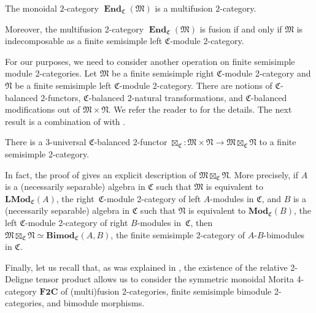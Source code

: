 \begin{Theorem}\label{thm:Moritadual}
The monoidal $2$-category $\mathbf{\operatorname{End}}_{\mathfrak{C}}(\mathfrak{M})$ is a multifusion $2$-category.
\end{Theorem}

Moreover, the multifusion 2-category $\mathbf{\operatorname{End}}_{\mathfrak{C}}(\mathfrak{M})$ is fusion if and only if $\mathfrak{M}$ is indecomposable as a finite semisimple left $\mathfrak{C}$-module 2-category.

For our purposes, we need to consider another operation on finite semisimple module 2-categories. Let $\mathfrak{M}$ be a finite semisimple right $\mathfrak{C}$-module 2-category and $\mathfrak{N}$ be a finite semisimple left $\mathfrak{C}$-module 2-category. There are notions of $\mathfrak{C}$-balanced 2-functors, $\mathfrak{C}$-balanced 2-natural transformations, and $\mathfrak{C}$-balanced modifications out of $\mathfrak{M}\times\mathfrak{N}$. We refer the reader to \cite[Section~2.2]{D10} for the details. The next result is a combination of \cite[Theorem~2.2.4]{D10} with \cite[Corollary~5.1.3]{D9}.

\begin{Theorem}
There is a $3$-universal $\mathfrak{C}$-balanced $2$-functor $\boxtimes_{\mathfrak{C}}\colon \mathfrak{M}\times\mathfrak{N}\rightarrow \mathfrak{M}\boxtimes_{\mathfrak{C}}\mathfrak{N}$ to a finite semisimple $2$-category.
\end{Theorem}

In fact, the proof of \cite[Theorem~2.2.4]{D10} gives an explicit description of $\mathfrak{M}\boxtimes_{\mathfrak{C}}\mathfrak{N}$. More precisely, if $A$ is a (necessarily separable) algebra in $\mathfrak{C}$ such that $\mathfrak{M}$ is equivalent to $\mathbf{LMod}_{\mathfrak{C}}(A)$, the right~$\mathfrak{C}$-module 2-category of left $A$-modules in $\mathfrak{C}$, and $B$ is a (necessarily separable) algebra in $\mathfrak{C}$ such that $\mathfrak{N}$ is equivalent to $\mathbf{Mod}_{\mathfrak{C}}(B)$, the left $\mathfrak{C}$-module 2-category of right $B$-modules in~$\mathfrak{C}$, then~$\mathfrak{M}\boxtimes_{\mathfrak{C}}\mathfrak{N}\simeq \mathbf{Bimod}_{\mathfrak{C}}(A,B)$, the finite semisimple 2-category of $A$-$B$-bimodules in $\mathfrak{C}$.

Finally, let us recall that, as was explained in \cite[Section~3.2]{D10}, the existence of the relative 2-Deligne tensor product allows us to consider the symmetric monoidal Morita 4-category $\mathbf{F2C}$ of (multi)fusion 2-categories, finite semisimple bimodule 2-categories, and bimodule morphisms.

